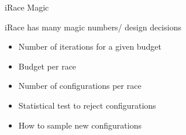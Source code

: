 \begin{frame}[c,fragile]{iRace Magic}

iRace has many magic numbers/ design decisions

\begin{itemize}
  \item Number of iterations for a given budget
  \item Budget per race
  \item Number of configurations per race
  \item Statistical test to reject configurations
  \item How to sample new configurations
\end{itemize}

\end{frame}


